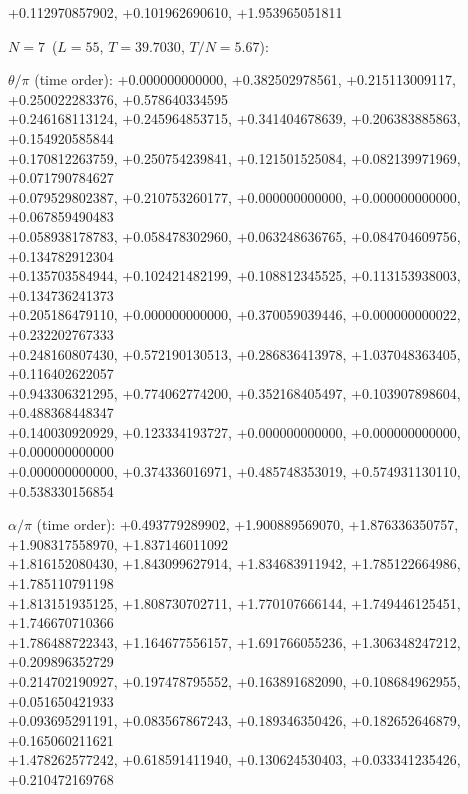 \begin{flushleft}
+0.112970857902, +0.101962690610, +1.953965051811
\vspace{3pt}\par\noindent\textbf{$N=7$}\ ($L=55$, $T=39.7030$, $T/N=5.67$):
\par\noindent$\theta/\pi$ (time order):
+0.000000000000, +0.382502978561, +0.215113009117, +0.250022283376, +0.578640334595 \\
+0.246168113124, +0.245964853715, +0.341404678639, +0.206383885863, +0.154920585844 \\
+0.170812263759, +0.250754239841, +0.121501525084, +0.082139971969, +0.071790784627 \\
+0.079529802387, +0.210753260177, +0.000000000000, +0.000000000000, +0.067859490483 \\
+0.058938178783, +0.058478302960, +0.063248636765, +0.084704609756, +0.134782912304 \\
+0.135703584944, +0.102421482199, +0.108812345525, +0.113153938003, +0.134736241373 \\
+0.205186479110, +0.000000000000, +0.370059039446, +0.000000000022, +0.232202767333 \\
+0.248160807430, +0.572190130513, +0.286836413978, +1.037048363405, +0.116402622057 \\
+0.943306321295, +0.774062774200, +0.352168405497, +0.103907898604, +0.488368448347 \\
+0.140030920929, +0.123334193727, +0.000000000000, +0.000000000000, +0.000000000000 \\
+0.000000000000, +0.374336016971, +0.485748353019, +0.574931130110, +0.538330156854
\par\noindent$\alpha/\pi$ (time order):
+0.493779289902, +1.900889569070, +1.876336350757, +1.908317558970, +1.837146011092 \\
+1.816152080430, +1.843099627914, +1.834683911942, +1.785122664986, +1.785110791198 \\
+1.813151935125, +1.808730702711, +1.770107666144, +1.749446125451, +1.746670710366 \\
+1.786488722343, +1.164677556157, +1.691766055236, +1.306348247212, +0.209896352729 \\
+0.214702190927, +0.197478795552, +0.163891682090, +0.108684962955, +0.051650421933 \\
+0.093695291191, +0.083567867243, +0.189346350426, +0.182652646879, +0.165060211621 \\
+1.478262577242, +0.618591411940, +0.130624530403, +0.033341235426, +0.210472169768 \\

\end{flushleft}
